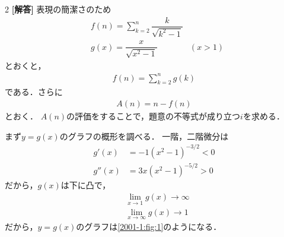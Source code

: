 \documentclass[../../main.tex]{subfiles}
\begin{document}
\setcounter{equation}{0}
\begin{oframed}
  
\end{oframed}
\setlength{\columnseprule}{0.4pt}
\begin{multicols}{2}
  {\bf [解答]}
  表現の簡潔さのため
  \begin{align}
    & f(n) = \sum_{k=2}^{n}\dfrac{k}{\sqrt{k^2-1}}         \\
    & g(x) = \dfrac{x}{\sqrt{x^2-1}}               & (x>1)
  \end{align}
  とおくと，
  \begin{align}
    f(n) = \sum_{k=2}^{n} g(k) \label{eq:1}
  \end{align}
  である．さらに
  \begin{align}
    A(n) = n-f(n)
  \end{align}
  とおく．
  $A(n)$の評価をすることで，題意の不等式が成り立つ$i$を求める．

  まず$y=g(x)$のグラフの概形を調べる．
  一階，二階微分は
  \begin{align}
    g'(x)
    & = -1(x^2-1)^{-3/2} < 0 \\
    g''(x)
    & =3x(x^2-1)^{-5/2} > 0
  \end{align}
  だから，$g(x)$は下に凸で，
  \begin{align}
    & \lim_{x\to 1} g(x) \to \infty \\
    & \lim_{x\to \infty} g(x) \to 1
  \end{align}
  だから，$y=g(x)$のグラフは\cref{2001-1:fig:1}のようになる．

  \begin{figure}[H]
    \centering
\end{figure}
\end{multicols}
\end{document}
